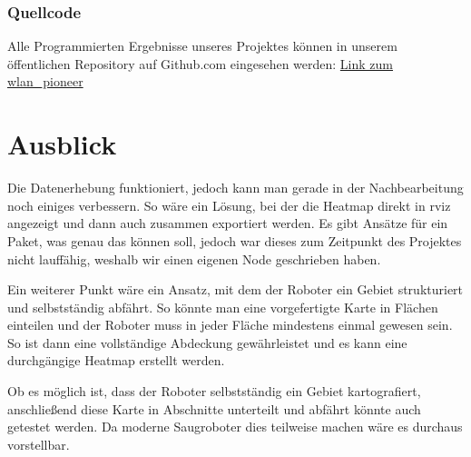 \documentclass{scrartcl}%
\begin{document}
\subsubsection{Quellcode}
Alle Programmierten Ergebnisse unseres Projektes können in unserem öffentlichen Repository auf Github.com eingesehen werden: \href{https://github.com/fzirker/wlan_pioneer}{Link zum wlan\_pioneer}

\newpage
\section{Ausblick}
Die Datenerhebung funktioniert, jedoch kann man gerade in der Nachbearbeitung noch einiges verbessern. So wäre ein Lösung, bei der die Heatmap direkt in rviz angezeigt und dann auch zusammen exportiert werden. Es gibt Ansätze für ein Paket, was genau das können soll, jedoch war dieses zum Zeitpunkt des Projektes nicht lauffähig, weshalb wir einen eigenen Node geschrieben haben.

Ein weiterer Punkt wäre ein Ansatz, mit dem der Roboter ein Gebiet strukturiert und selbstständig abfährt. So könnte man eine vorgefertigte Karte in Flächen einteilen und der Roboter muss in jeder Fläche mindestens einmal gewesen sein. So ist dann eine vollständige Abdeckung gewährleistet und es kann eine durchgängige Heatmap erstellt werden.

Ob es möglich ist, dass der Roboter selbstständig ein Gebiet kartografiert, anschließend diese Karte in Abschnitte unterteilt und abfährt könnte auch getestet werden. Da moderne Saugroboter dies teilweise machen wäre es durchaus vorstellbar.

\newpage
\begin{flushleft}
	\printbibliography
\end{flushleft}
\end{document}
